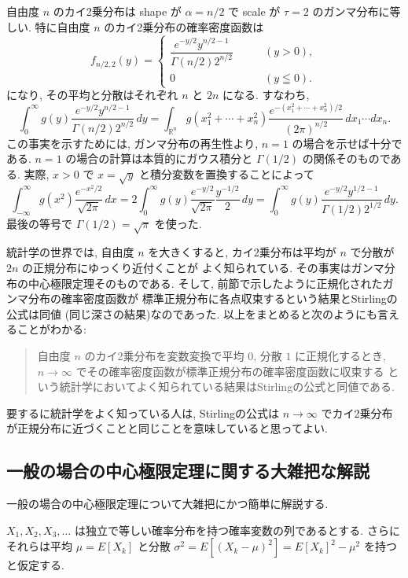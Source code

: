 \documentclass[12pt,twoside]{jarticle}
\newcommand\R{{\mathbb R}} %
\theoremstyle{jplain}
\theoremstyle{jplain}
\theoremstyle{jplain}
\numberwithin{theorem}{section}
\numberwithin{equation}{section}
\numberwithin{figure}{section}
\numberwithin{table}{section}
\begin{document}
自由度 $n$ のカイ2乗分布は
shape が $\alpha=n/2$ で scale が $\tau=2$ のガンマ分布に等しい.
特に自由度 $n$ のカイ2乗分布の確率密度函数は
\[
f_{n/2,2}(y) =
\begin{cases}
\dfrac{e^{-y/2}y^{n/2-1}}{\Gamma(n/2)2^{n/2}} & \qquad (y>0), \\
0 & \qquad (y\leqq 0).
\end{cases}
\]
になり, その平均と分散はそれぞれ $n$ と $2n$ になる. すなわち,
\[
\int_0^\infty g(y) \frac{e^{-y/2}y^{n/2-1}}{\Gamma(n/2)2^{n/2}}\,dy
=\int_{\R^n} g(x_1^2+\cdots+x_n^2) \frac{e^{-(x_1^2+\cdots+x_n^2)/2}}{(2\pi)^{n/2}}\,dx_1\cdots dx_n.
\]
この事実を示すためには, ガンマ分布の再生性より, $n=1$ の場合を示せば十分である.
$n=1$ の場合の計算は本質的にガウス積分と $\Gamma(1/2)$ の関係そのものである.
実際, $x>0$ で $x=\sqrt{y}$ と積分変数を置換することによって
\[
\int_{-\infty}^\infty g(x^2)\frac{e^{-x^2/2}}{\sqrt{2\pi}}\,dx
=2\int_0^\infty g(y) \frac{e^{-y/2}}{\sqrt{2\pi}}\frac{y^{-1/2}}{2}\,dy
=\int_0^\infty g(y)\frac{e^{-y/2}y^{1/2-1}}{\Gamma(1/2)2^{1/2}}\,dy.
\]
最後の等号で $\Gamma(1/2)=\sqrt{\pi}$ を使った.

統計学の世界では, 自由度 $n$ を大きくすると, 
カイ2乗分布は平均が $n$ で分散が $2n$ の正規分布にゆっくり近付くことが
よく知られている. 
その事実はガンマ分布の中心極限定理そのものである.
そして, 前節で示したように正規化されたガンマ分布の確率密度函数が
標準正規分布に各点収束するという結果とStirlingの公式は同値
(同じ深さの結果)なのであった.
以上をまとめると次のようにも言えることがわかる:
\begin{quote}
自由度 $n$ のカイ2乗分布を変数変換で平均 $0$, 分散 $1$ に正規化するとき,
$n\to\infty$ でその確率密度函数が標準正規分布の確率密度函数に収束する
という統計学においてよく知られている結果はStirlingの公式と同値である.
\end{quote}
要するに統計学をよく知っている人は, Stirlingの公式は
$n\to\infty$ でカイ2乗分布が正規分布に近づくことと同じことを意味していると思ってよい.


\subsection{一般の場合の中心極限定理に関する大雑把な解説}

一般の場合の中心極限定理について大雑把にかつ簡単に解説する.

$X_1,X_2,X_3,\ldots$ は独立で等しい確率分布を持つ確率変数の列であるとする.
さらにそれらは平均 $\mu=E[X_k]$ と分散 $\sigma^2=E[(X_k-\mu)^2]=E[X_k]^2-\mu^2$
を持つと仮定する. 
\end{document}
